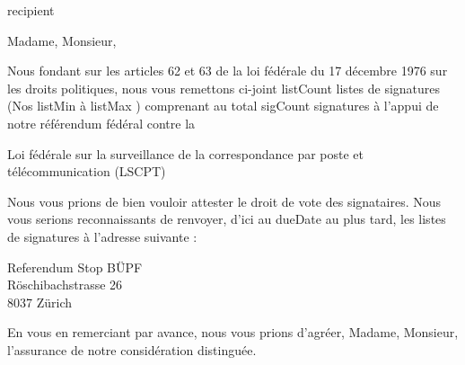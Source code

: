 \documentclass[a4paper,10pt,parskip=half,french]{scrlttr2}
\begin{document}
\begin{letter}{ {{ recipient }} }





\opening{Madame, Monsieur,}

Nous fondant sur les articles 62 et 63 de la loi fédérale du 17 décembre 1976 sur les droits politiques, nous vous remettons ci-joint {{ listCount }} listes de signatures (Nos  {{ listMin }} à {{ listMax }}) comprenant au total {{ sigCount }} signatures à l’appui de notre référendum fédéral contre la

\leftskip=3mm
Loi fédérale sur la surveillance de la correspondance par poste et télécommunication (LSCPT)

\leftskip=0mm
Nous vous prions de bien vouloir attester le droit de vote des signataires. Nous vous serions reconnaissants de renvoyer, d’ici au {{ dueDate }} au plus tard, les listes de signatures à l’adresse suivante :

\leftskip=3mm
Referendum Stop BÜPF \\
Röschibachstrasse 26 \\
8037 Zürich

\leftskip=0mm
\closing{En vous en remerciant par avance, nous vous prions d’agréer, Madame, Monsieur, l’assurance de notre considération distinguée.}

\end{letter}
\end{document}
